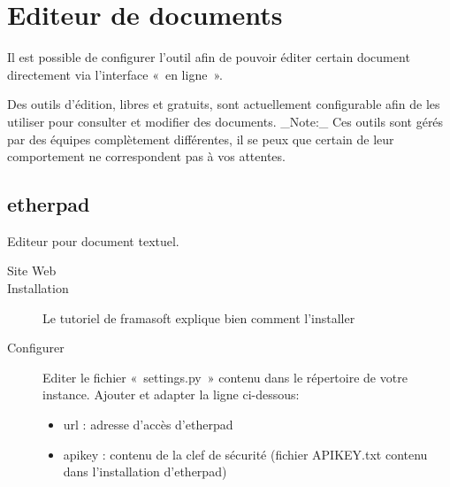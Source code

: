 \documentclass[a4paper,10pt,oneside,french]{sphinxmanual}
\begin{document}
\section{Editeur de documents}
\label{\detokenize{documents/editor:editeur-de-documents}}\label{\detokenize{documents/editor::doc}}
Il est possible de configurer l’outil afin de pouvoir éditer certain document directement via l’interface « en ligne ».

Des outils d’édition, libres et gratuits, sont actuellement configurable afin de les utiliser pour consulter et modifier des documents.
\_Note:\_ Ces outils sont gérés par des équipes complètement différentes, il se peux que certain de leur comportement ne correspondent pas à vos attentes.


\subsection{etherpad}
\label{\detokenize{documents/editor:etherpad}}
Editeur pour document textuel.
\begin{description}
\item[{Site Web}] \leavevmode
{}

\item[{Installation}] \leavevmode
Le tutoriel de framasoft explique bien comment l’installer

\item[{Configurer}] \leavevmode
Editer le fichier « settings.py » contenu dans le répertoire de votre instance.
Ajouter et adapter la ligne ci-dessous:
\begin{itemize}
\item {} 
url : adresse d’accès d’etherpad

\item {} 
apikey : contenu de la clef de sécurité (fichier APIKEY.txt contenu dans l’installation d’etherpad)

\end{itemize}

\end{description}
\end{document}
